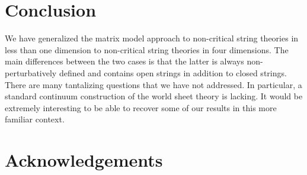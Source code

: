 \documentclass[a4paper,12pt]{article}
\begin{document}
{\section{Conclusion}
%

We have generalized the matrix model approach to non-critical string 
theories in less than one dimension \cite{DK,BK} to non-critical string 
theories in four dimensions. The main differences between the two cases is 
that the latter is always non-perturbatively defined and contains open 
strings in addition to closed strings. There are many tantalizing 
questions that we have not addressed. In particular, a standard continuum 
construction of the world sheet theory is lacking. It would be extremely 
interesting to be able to recover some of our results in this more 
familiar context.

%
\section*{Acknowledgements}
%

}
\end{document}
